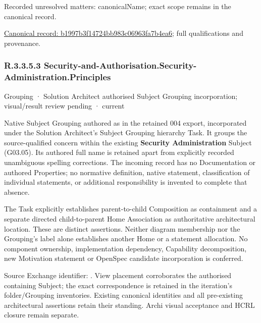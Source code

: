 {\small Recorded unresolved matters: canonicalName; exact scope remains in the canonical record.}\par
{\footnotesize \href{../../../../continuum/grouping/b1997b3f14724bb983c06963fa7b4ea6.md}{Canonical record: b1997b3f14724bb983c06963fa7b4ea6}; full qualifications and provenance.}\par
\subsubsection*{R.3.3.5.3 Security-and-Authorisation.Security-Administration.Principles}
\label{navigation:R.3.3.5.3}

\label{element:c189826cd7024780abd89fa4f067947a}
{\small Grouping · Solution Architect authorised Subject Grouping incorporation; visual/result review pending · current}\par

Native Subject Grouping authored as \texttt{} in the retained 004 export,
incorporated under the Solution Architect's Subject Grouping hierarchy Task.
It groups the source-qualified \texttt{} concern within
the existing \textbf{Security Administration} Subject (G03.05). Its authored full name
is retained apart from explicitly recorded unambiguous spelling corrections.
The incoming record has no Documentation or authored Properties; no normative
definition, native statement, classification of individual statements, or
additional responsibility is invented to complete that absence.



The Task explicitly establishes parent-to-child Composition as containment and
a separate directed child-to-parent Home Association as authoritative architectural
location. These are distinct assertions. Neither diagram membership nor the
Grouping's label alone establishes another Home or a statement allocation.
No component ownership, implementation dependency, Capability decomposition,
new Motivation statement or OpenSpec candidate incorporation is conferred.



Source Exchange identifier: \texttt{}. View placement corroborates
the authorised containing Subject; the exact correspondence is retained in the
iteration's folder/Grouping inventories. Existing canonical identities and all
pre-existing architectural assertions retain their standing. Archi visual
acceptance and HCRL closure remain separate.



